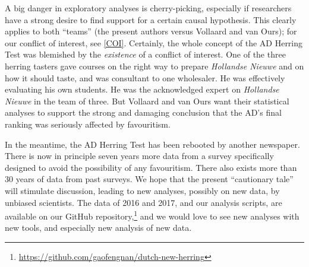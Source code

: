 \documentclass[alpha-refs]{wiley-article}
\begin{document}
A big danger in exploratory analyses is cherry-picking, especially if researchers have a strong desire to find support for a certain causal hypothesis. This clearly applies to both ``teams'' (the present authors versus Vollaard and van Ours); for our conflict of interest, see \cref{COI}. Certainly, the whole concept of the AD Herring Test was blemished by the \emph{existence} of a conflict of interest. One of the three herring tasters gave courses on the right way to prepare \emph{Hollandse Nieuwe} and on how it should taste, and was consultant to one wholesaler. He was effectively evaluating his own students. He was the acknowledged expert on \emph{Hollandse Nieuwe} in the team of three.  But Vollaard and van Ours want their statistical analyses to support the strong and damaging conclusion that the AD's final ranking was seriously affected by favouritism.

In the meantime, the AD Herring Test has been rebooted by another newspaper. There is now in principle seven years more data from a survey specifically designed to avoid the possibility of any favouritism. There also exists more than 30 years of data from past surveys. We hope that the present ``cautionary tale'' will stimulate discussion, leading to new analyses, possibly on new data, by unbiased scientists. The data of 2016 and 2017, and our analysis scripts, are available on our GitHub repository,\footnote{\url{https://github.com/gaofengnan/dutch-new-herring}} and we would love to see new analyses with new tools, and especially new analysis of new data.
\end{document}
